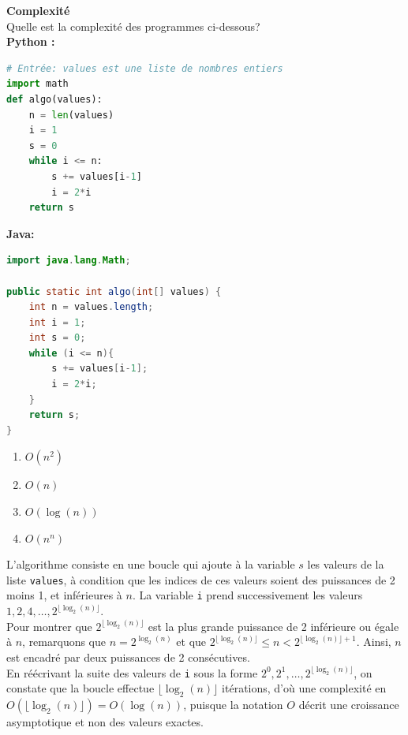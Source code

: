 \begin{Exercice}[10 minutes] \textbf{Complexité} \\
    Quelle est la complexité des programmes ci-dessous?\\
    \textbf{Python :}
    \begin{lstlisting}[language=Python]
# Entrée: values est une liste de nombres entiers
import math
def algo(values):
    n = len(values)
    i = 1
    s = 0
    while i <= n:
        s += values[i-1]
        i = 2*i
    return s
    \end{lstlisting}
    
    \textbf{Java:}
    \begin{lstlisting}[language=Java]
import java.lang.Math; 

public static int algo(int[] values) {
    int n = values.length;
    int i = 1;
    int s = 0;
    while (i <= n){
        s += values[i-1];
        i = 2*i;
    }
    return s;
} \end{lstlisting}

    \begin{enumerate}[label=(\Alph*)]
        \item $O(n^2)$
        \item $O(n)$
        \item $O(\log(n))$
        \item $O(n^n)$
    \end{enumerate}

    \begin{solution}
    L'algorithme consiste en une boucle qui ajoute à la variable $s$ les valeurs de la liste \texttt{values}, à condition que les indices de ces valeurs soient des puissances de 2 moins 1, et inférieures à $n$. La variable \texttt{i} prend successivement les valeurs $1, 2, 4, \ldots, 2^{\lfloor \log_2(n) \rfloor}$. \\ 

    Pour montrer que $2^{\lfloor \log_2(n) \rfloor}$ est la plus grande puissance de 2 inférieure ou égale à $n$, remarquons que $n = 2^{\log_2(n)}$ et que $2^{\lfloor \log_2(n) \rfloor} \leq n < 2^{\lfloor \log_2(n) \rfloor + 1}$. Ainsi, $n$ est encadré par deux puissances de 2 consécutives. \\
    
    En réécrivant la suite des valeurs de \texttt{i} sous la forme $2^0, 2^1, \ldots, 2^{\lfloor \log_2(n) \rfloor}$, on constate que la boucle effectue $\lfloor \log_2(n) \rfloor$ itérations, d'où une complexité en $O(\lfloor \log_2(n) \rfloor) = O(\log(n))$, puisque la notation $O$ décrit une croissance asymptotique et non des valeurs exactes.
    \end{solution}    

\end{Exercice}

